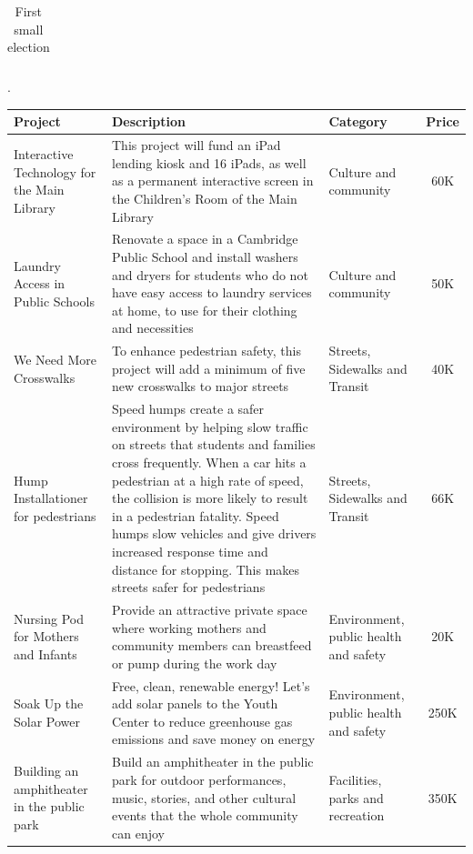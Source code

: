 \documentclass[10pt]{article}
\begin{document}
\begin{appendices}
\begin{table}[ht!]
\begin{center}
\begin{tabular}{|p{4cm}|p{8cm}|p{3cm}|c|}
     \hline
    \end{tabular}
  \caption{First small election}\label{tab:first_elc}.
  \end{center}
\end{table}

\begin{table}[ht!]
  \begin{center}
    \begin{tabular}{|p{4cm}|p{8cm}|p{3cm}|c|}
    \hline
    \textbf{Project} & \textbf{Description} & \textbf{Category} & \textbf{Price}\\
    \hline
    Interactive Technology for the Main Library & This project will fund an iPad lending kiosk and 16 iPads, as well as a permanent interactive screen in the Children’s Room of the Main Library & Culture and community & 60K\\
    \hline
    Laundry Access in Public Schools & Renovate a space in a Cambridge Public School and install washers and dryers for students who do not have easy access to laundry services at home, to use for their clothing and necessities & Culture and community & 50K\\
    \hline
    We Need More Crosswalks & To enhance pedestrian safety, this project will add a minimum of five new crosswalks to major streets & Streets, Sidewalks and Transit &  40K\\
    \hline
    Hump Installationer for pedestrians & Speed humps create a safer environment by helping slow traffic on streets that students and families cross frequently. When a car hits a pedestrian at a high rate of speed, the collision is more likely to result in a pedestrian fatality. Speed humps slow vehicles and give drivers increased response time and distance for stopping. This makes streets safer for pedestrians & Streets, Sidewalks and Transit & 66K\\
    \hline
    Nursing Pod for Mothers and Infants & Provide an attractive private space where working mothers and community members can breastfeed or pump during the work day & Environment, public health and safety & 20K\\
    \hline
    Soak Up the Solar Power & Free, clean, renewable energy! Let’s add solar panels to the Youth Center to reduce greenhouse gas emissions and save money on energy & Environment, public health and safety & 250K\\
    \hline
    Building an amphitheater in the public park & Build an amphitheater in the public park for outdoor performances, music, stories, and other cultural events that the whole community can enjoy & Facilities, parks and recreation & 350K\\

\end{tabular}
\end{center}
\end{table}
\end{appendices}
\end{document}
